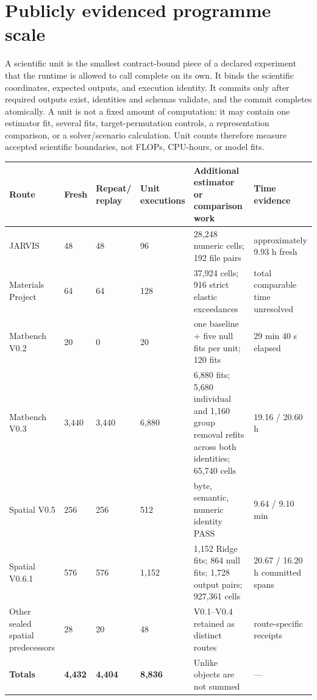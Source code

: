 \section{Publicly evidenced programme scale}

A scientific unit is the smallest contract-bound piece of a declared experiment that the runtime is allowed to call complete on its own. It binds the scientific coordinates, expected outputs, and execution identity. It commits only after required outputs exist, identities and schemas validate, and the commit completes atomically. A unit is not a fixed amount of computation: it may contain one estimator fit, several fits, target-permutation controls, a representation comparison, or a solver/scenario calculation. Unit counts therefore measure accepted scientific boundaries, not FLOPs, CPU-hours, or model fits.

\begin{longtable}{L{0.14\textwidth}L{0.09\textwidth}L{0.10\textwidth}L{0.10\textwidth}L{0.31\textwidth}L{0.16\textwidth}}
\toprule
\textbf{Route} & \textbf{Fresh} & \textbf{Repeat/ replay} & \textbf{Unit executions} & \textbf{Additional estimator or comparison work} & \textbf{Time evidence}\\\midrule
JARVIS & 48 & 48 & 96 & 28,248 numeric cells; 192 file pairs & approximately 9.93 h fresh\\
Materials Project & 64 & 64 & 128 & 37,924 cells; 916 strict elastic exceedances & total comparable time unresolved\\
Matbench V0.2 & 20 & 0 & 20 & one baseline + five null fits per unit; 120 fits & 29 min 40 s elapsed\\
Matbench V0.3 & 3,440 & 3,440 & 6,880 & 6,880 fits; 5,680 individual and 1,160 group removal refits across both identities; 65,740 cells & 19.16 / 20.60 h\\
Spatial V0.5 & 256 & 256 & 512 & byte, semantic, numeric identity PASS & 9.64 / 9.10 min\\
Spatial V0.6.1 & 576 & 576 & 1,152 & 1,152 Ridge fits; 864 null fits; 1,728 output pairs; 927,361 cells & 20.67 / 16.20 h committed spans\\
Other sealed spatial predecessors & 28 & 20 & 48 & V0.1--V0.4 retained as distinct routes & route-specific receipts\\\midrule
\textbf{Totals} & \textbf{4,432} & \textbf{4,404} & \textbf{8,836} & Unlike objects are not summed & ---\\\bottomrule
\end{longtable}

